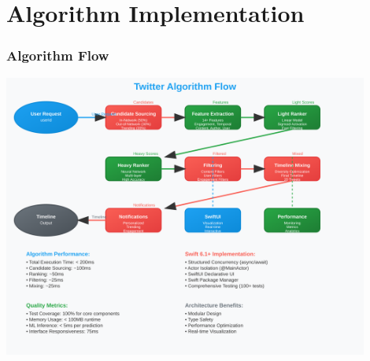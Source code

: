 \documentclass[aspectratio=169]{beamer}
\begin{document}
\section{Algorithm Implementation}

\begin{frame}
    \frametitle{Algorithm Flow}
    \begin{center}
        \includegraphics[width=0.9\textwidth]{images/algorithm-flow.svg}
    \end{center}
\end{frame}
\end{document}
